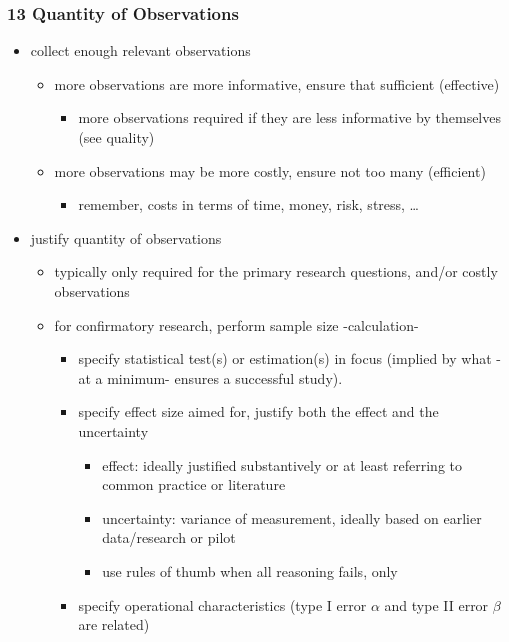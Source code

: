 \documentclass[
]{article}
\providecommand{\tightlist}{%
  \setlength{\itemsep}{0pt}\setlength{\parskip}{0pt}}
\begin{document}
\hypertarget{quantity-of-observations}{%
\subsubsection{13 Quantity of
Observations}\label{quantity-of-observations}}

\begin{itemize}
\tightlist
\item
  collect enough relevant observations

  \begin{itemize}
  \tightlist
  \item
    more observations are more informative, ensure that sufficient
    (effective)

    \begin{itemize}
    \tightlist
    \item
      more observations required if they are less informative by
      themselves (see quality)
    \end{itemize}
  \item
    more observations may be more costly, ensure not too many
    (efficient)

    \begin{itemize}
    \tightlist
    \item
      remember, costs in terms of time, money, risk, stress, \ldots{} \\
    \end{itemize}
  \end{itemize}
\item
  justify quantity of observations

  \begin{itemize}
  \tightlist
  \item
    typically only required for the primary research questions, and/or
    costly observations
  \item
    for confirmatory research, perform sample size -calculation-

    \begin{itemize}
    \tightlist
    \item
      specify statistical test(s) or estimation(s) in focus (implied by
      what -at a minimum- ensures a successful study).
    \item
      specify effect size aimed for, justify both the effect and the
      uncertainty

      \begin{itemize}
      \tightlist
      \item
        effect: ideally justified substantively or at least referring to
        common practice or literature
      \item
        uncertainty: variance of measurement, ideally based on earlier
        data/research or pilot
      \item
        use rules of thumb when all reasoning fails, only
      \end{itemize}
    \item
      specify operational characteristics (type I error \(\alpha\) and
      type II error \(\beta\) are related)


\end{itemize}
\end{itemize}
\end{itemize}
\end{document}

